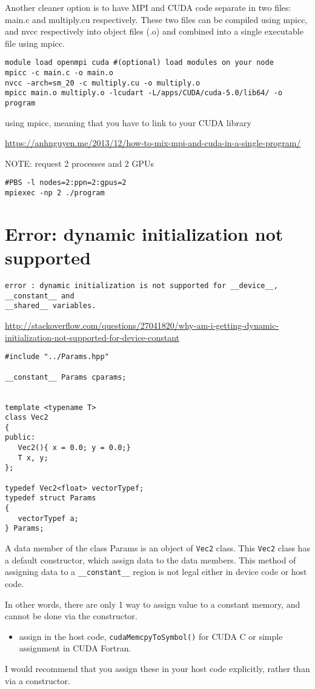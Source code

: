 Another cleaner option is to have MPI and CUDA code separate in two files:
main.c and multiply.cu respectively. These two files can be compiled using
mpicc, and nvcc respectively into object files (.o) and combined into a single
executable file using mpicc.

\begin{verbatim}
module load openmpi cuda #(optional) load modules on your node
mpicc -c main.c -o main.o
nvcc -arch=sm_20 -c multiply.cu -o multiply.o
mpicc main.o multiply.o -lcudart -L/apps/CUDA/cuda-5.0/lib64/ -o program
\end{verbatim}
using mpicc, meaning that you have to link to your CUDA library

\url{https://anhnguyen.me/2013/12/how-to-mix-mpi-and-cuda-in-a-single-program/}

NOTE: request 2 processes and 2 GPUs
\begin{verbatim}
#PBS -l nodes=2:ppn=2:gpus=2
mpiexec -np 2 ./program
\end{verbatim}

\section{Error: dynamic initialization not supported}
\label{sec:constant_memory_C++}

\begin{verbatim}
error : dynamic initialization is not supported for __device__, __constant__ and
__shared__ variables.
\end{verbatim}
\url{http://stackoverflow.com/questions/27041820/why-am-i-getting-dynamic-initialization-not-supported-for-device-constant}

\begin{verbatim}
#include "../Params.hpp"

__constant__ Params cparams;


template <typename T>
class Vec2
{
public:
   Vec2(){ x = 0.0; y = 0.0;}
   T x, y;
};

typedef Vec2<float> vectorTypef;
typedef struct Params
{
   vectorTypef a;
} Params;
\end{verbatim}

A data member of the class Params is an object of \verb!Vec2! class. This
\verb!Vec2! class has a default constructor, which assign data to the data
members. This method of assigning data to a \verb!__constant__! region is not
legal either in device code or host code.

In other words, there are only 1 way to assign value to a constant memory,
and cannot be done via the constructor.
\begin{itemize}
  \item assign in the host code, \verb!cudaMemcpyToSymbol()! for CUDA C or
  simple assignment in CUDA Fortran.
\end{itemize}
I would recommend that you assign these in your host code explicitly, rather
than via a constructor.

